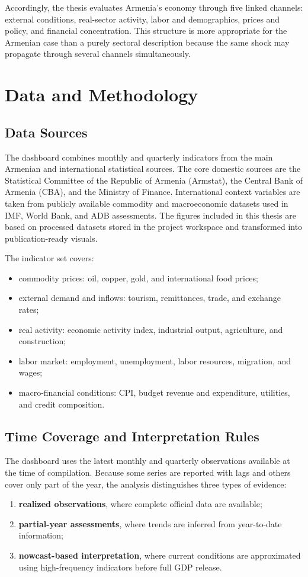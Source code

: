\documentclass[12pt,a4paper]{report}
\begin{document}
Accordingly, the thesis evaluates Armenia's economy through five linked channels: external conditions, real-sector activity, labor and demographics, prices and policy, and financial concentration. This structure is more appropriate for the Armenian case than a purely sectoral description because the same shock may propagate through several channels simultaneously.

\chapter{Data and Methodology}
\section{Data Sources}
The dashboard combines monthly and quarterly indicators from the main Armenian and international statistical sources. The core domestic sources are the Statistical Committee of the Republic of Armenia (Armstat), the Central Bank of Armenia (CBA), and the Ministry of Finance. International context variables are taken from publicly available commodity and macroeconomic datasets used in IMF, World Bank, and ADB assessments. The figures included in this thesis are based on processed datasets stored in the project workspace and transformed into publication-ready visuals.\cite{armstatbank,cbaMPR2025Q1,minfinBudget,imfCR24348,wbMEU2025,adbADO2024}

The indicator set covers:
\begin{itemize}
    \item commodity prices: oil, copper, gold, and international food prices;
    \item external demand and inflows: tourism, remittances, trade, and exchange rates;
    \item real activity: economic activity index, industrial output, agriculture, and construction;
    \item labor market: employment, unemployment, labor resources, migration, and wages;
    \item macro-financial conditions: CPI, budget revenue and expenditure, utilities, and credit composition.
\end{itemize}

\section{Time Coverage and Interpretation Rules}
The dashboard uses the latest monthly and quarterly observations available at the time of compilation. Because some series are reported with lags and others cover only part of the year, the analysis distinguishes three types of evidence:
\begin{enumerate}
    \item \textbf{realized observations}, where complete official data are available;
    \item \textbf{partial-year assessments}, where trends are inferred from year-to-date information;
    \item \textbf{nowcast-based interpretation}, where current conditions are approximated using high-frequency indicators before full GDP release.
\end{enumerate}
\end{document}

